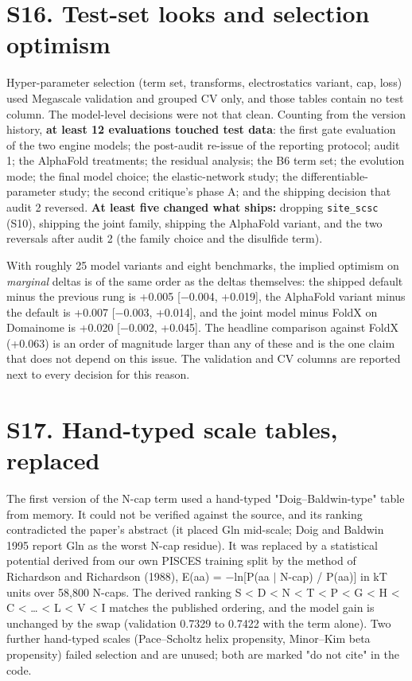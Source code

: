 \documentclass[11pt,a4paper]{article}
\begin{document}
\section{S16. Test-set looks and selection optimism}

Hyper-parameter selection (term set, transforms, electrostatics variant, cap, loss) used Megascale validation
and grouped CV only, and those tables contain no test column. The model-level decisions were not that clean.
Counting from the version history, \textbf{at least 12 evaluations touched test data}: the first gate evaluation of
the two engine models; the post-audit re-issue of the reporting protocol; audit 1; the AlphaFold treatments; the
residual analysis; the B6 term set; the evolution mode; the final model choice; the elastic-network study; the
differentiable-parameter study; the second critique's phase A; and the shipping decision that audit 2 reversed.
\textbf{At least five changed what ships:} dropping \texttt{site\_scsc} (S10), shipping the joint family, shipping the
AlphaFold variant, and the two reversals after audit 2 (the family choice and the disulfide term).

With roughly 25 model variants and eight benchmarks, the implied optimism on \emph{marginal} deltas is of the same
order as the deltas themselves: the shipped default minus the previous rung is +0.005 [$-$0.004, +0.019], the
AlphaFold variant minus the default is +0.007 [$-$0.003, +0.014], and the joint model minus FoldX on Domainome is
+0.020 [$-$0.002, +0.045]. The headline comparison against FoldX (+0.063) is an order of magnitude larger than any
of these and is the one claim that does not depend on this issue. The validation and CV columns are reported
next to every decision for this reason.



\section{S17. Hand-typed scale tables, replaced}

The first version of the N-cap term used a hand-typed "Doig--Baldwin-type" table from memory. It could not be
verified against the source, and its ranking contradicted the paper's abstract (it placed Gln mid-scale; Doig
and Baldwin 1995 report Gln as the worst N-cap residue). It was replaced by a statistical potential derived from
our own PISCES training split by the method of Richardson and Richardson (1988), E(aa) = $-$ln[P(aa $|$ N-cap) /
P(aa)] in kT units over 58,800 N-caps. The derived ranking S < D < N < T < P < G < H < C < \ldots{} < L < V < I matches
the published ordering, and the model gain is unchanged by the swap (validation 0.7329 to 0.7422 with the term
alone). Two further hand-typed scales (Pace--Scholtz helix propensity, Minor--Kim beta propensity) failed
selection and are unused; both are marked "do not cite" in the code.
\end{document}
